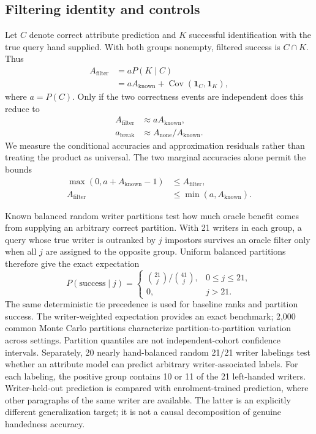 \subsection{Filtering identity and controls}
\label{sec:identity}
Let $C$ denote correct attribute prediction and $K$ successful identification with the true query hand supplied. With both groups nonempty, filtered success is $C\cap K$. Thus
\begin{align}
 A_{\mathrm{filter}}&=aP(K\mid C)\nonumber\\
 &=aA_{\mathrm{known}}+\operatorname{Cov}(\mathbf1_C,\mathbf1_K),
 \label{eq:exact}
\end{align}
where $a=P(C)$. Only if the two correctness events are independent does this reduce to
\begin{equation}
 \begin{aligned}
 A_{\mathrm{filter}}&\approx aA_{\mathrm{known}},\\
 a_{\mathrm{break}}&\approx A_{\mathrm{none}}/A_{\mathrm{known}}.
 \end{aligned}
 \label{eq:approx}
\end{equation}
We measure the conditional accuracies and approximation residuals rather than treating the product as universal. The two marginal accuracies alone permit the bounds
\begin{equation}
 \begin{aligned}
 \max(0,a+A_{\mathrm{known}}-1)&\leq A_{\mathrm{filter}},\\
 A_{\mathrm{filter}}&\leq\min(a,A_{\mathrm{known}}).
 \end{aligned}
 \label{eq:bounds}
\end{equation}

Known balanced random writer partitions test how much oracle benefit comes from supplying an arbitrary correct partition. With 21 writers in each group, a query whose true writer is outranked by $j$ impostors survives an oracle filter only when all $j$ are assigned to the opposite group. Uniform balanced partitions therefore give the exact expectation
\begin{equation}
P(\mathrm{success}\mid j)=\begin{cases}\binom{21}{j}/\binom{41}{j},&0\leq j\leq21,\\0,&j>21.\end{cases}
\label{eq:randompartition}
\end{equation}
The same deterministic tie precedence is used for baseline ranks and partition success. The writer-weighted expectation provides an exact benchmark; 2,000 common Monte Carlo partitions characterize partition-to-partition variation across settings. Partition quantiles are not independent-cohort confidence intervals. Separately, 20 nearly hand-balanced random 21/21 writer labelings test whether an attribute model can predict arbitrary writer-associated labels. For each labeling, the positive group contains 10 or 11 of the 21 left-handed writers. Writer-held-out prediction is compared with enrolment-trained prediction, where other paragraphs of the same writer are available. The latter is an explicitly different generalization target; it is not a causal decomposition of genuine handedness accuracy.

